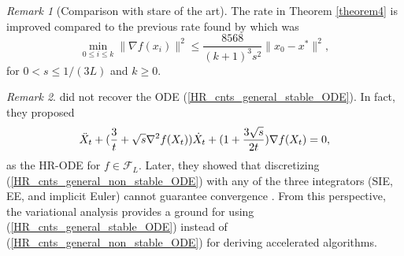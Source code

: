 \documentclass{article}
\theoremstyle{plain}
\theoremstyle{definition}
\theoremstyle{remark}
\newtheorem{remark}{Remark}[theorem]
\begin{document}
\begin{remark}[Comparison with stare of the art]
    The rate in Theorem \ref{theorem4} is improved compared to the previous rate found by \citep{Shi2021UnderstandingTA} which was 
$$ \min_{0\leq i\leq k}\|\nabla f(x_i)\|^2 \leq \frac{8568}{(k+1)^3s^2}\|x_0-x^*\|^2,$$
for $0< s\leq 1/(3L)$ and $k\geq0$.
\end{remark}
\begin{remark}
\citep{shi2019acceleration} did not recover the ODE (\ref{HR_cnts_general_stable_ODE}). In fact, they proposed 
\begin{align}\label{HR_cnts_general_non_stable_ODE}
     \Ddot{X}_t + (\frac{3}{t}+\sqrt{s}\nabla^2 f(X_t))\dot{X}_t+(1+\frac{3\sqrt{s}}{2t})\nabla f(X_t)=0,
\end{align}
as the HR-ODE for \(f\in \mathcal{F}_L\). Later, they showed that discretizing (\ref{HR_cnts_general_non_stable_ODE}) with any of the three integrators (SIE, EE, and implicit Euler) cannot guarantee convergence \citep{shi2019acceleration}. From this perspective, the variational analysis provides a ground for using (\ref{HR_cnts_general_stable_ODE}) instead of (\ref{HR_cnts_general_non_stable_ODE}) for deriving accelerated algorithms.
\end{remark}
\end{document}
